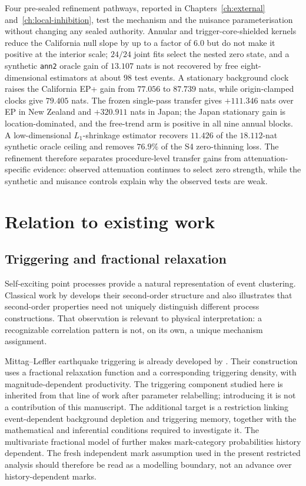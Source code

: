 Four pre-sealed refinement pathways, reported in Chapters~\ref{ch:external} and~\ref{ch:local-inhibition}, test the mechanism and the nuisance parameterisation without changing any sealed authority. Annular and trigger-core-shielded kernels reduce the California null slope by up to a factor of $6.0$ but do not make it positive at the interior scale; $24/24$ joint fits select the nested zero state, and a synthetic \texttt{ann2} oracle gain of $13.107$ nats is not recovered by free eight-dimensional estimators at about $98$ test events. A stationary background clock raises the California EP+ gain from $77.056$ to $87.739$ nats, while origin-clamped clocks give $79.405$ nats. The frozen single-pass transfer gives $+111.346$ nats over EP in New Zealand and $+320.911$ nats in Japan; the Japan stationary gain is location-dominated, and the free-trend arm is positive in all nine annual blocks. A low-dimensional $L_1$-shrinkage estimator recovers $11.426$ of the $18.112$-nat synthetic oracle ceiling and removes $76.9\%$ of the S4 zero-thinning loss. The refinement therefore separates procedure-level transfer gains from attenuation-specific evidence: observed attenuation continues to select zero strength, while the synthetic and nuisance controls explain why the observed tests are weak.

\section{Relation to existing work}
\label{sec:related_work}

\subsection{Triggering and fractional relaxation}

Self-exciting point processes provide a natural representation of event clustering. Classical work by \citet{Hawkes1971} develops their second-order structure and also illustrates that second-order properties need not uniquely distinguish different process constructions. That observation is relevant to physical interpretation: a recognizable correlation pattern is not, on its own, a unique mechanism assignment.

Mittag--Leffler earthquake triggering is already developed by \citet{DavisBaeumerWang2024}. Their construction uses a fractional relaxation function and a corresponding triggering density, with magnitude-dependent productivity. The triggering component studied here is inherited from that line of work after parameter relabelling; introducing it is not a contribution of this manuscript. The additional target is a restriction linking event-dependent background depletion and triggering memory, together with the mathematical and inferential conditions required to investigate it. The multivariate fractional model of \citet{DavisBaeumerWang2026} further makes mark-category probabilities history dependent. The fresh independent mark assumption used in the present restricted analysis should therefore be read as a modelling boundary, not an advance over history-dependent marks.

